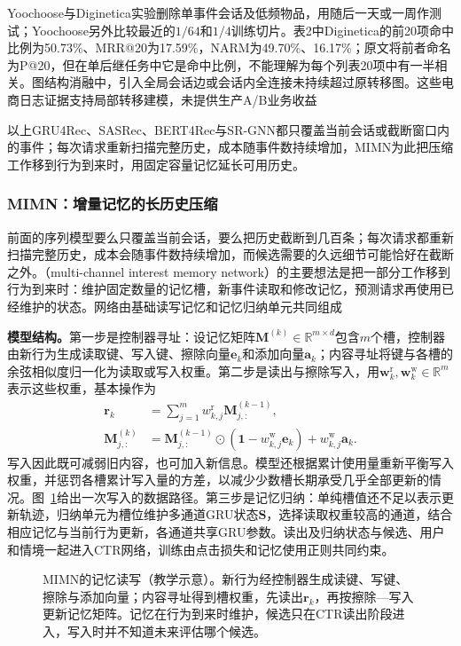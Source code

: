 Yoochoose与Diginetica实验删除单事件会话及低频物品，用随后一天或一周作测试；Yoochoose另外比较最近的$1/64$和$1/4$训练切片。表2中Diginetica的前20项命中比例为50.73\%、MRR@20为17.59\%，NARM为49.70\%、16.17\%；原文将前者命名为P@20，但在单后继任务中它是命中比例，不能理解为每个列表20项中有一半相关。图结构消融中，引入全局会话边或会话内全连接未持续超过原转移图。这些电商日志证据支持局部转移建模，未提供生产A/B业务收益

以上GRU4Rec、SASRec、BERT4Rec与SR-GNN都只覆盖当前会话或截断窗口内的事件；每次请求重新扫描完整历史，成本随事件数持续增加，MIMN为此把压缩工作移到行为到来时，用固定容量记忆延长可用历史。
\subsubsection{MIMN：增量记忆的长历史压缩}
\label{sec:rs-mimn}

前面的序列模型要么只覆盖当前会话，要么把历史截断到几百条；每次请求都重新扫描完整历史，成本会随事件数持续增加，而候选需要的久远细节可能恰好在截断之外。（multi-channel interest memory network）的主要想法是把一部分工作移到行为到来时：维护固定数量的记忆槽，新事件读取和修改记忆，预测请求再使用已经维护的状态。网络由基础读写记忆和记忆归纳单元共同组成

\textbf{模型结构。}第一步是控制器寻址：设记忆矩阵$\bm{M}^{(k)}\in\mathbb{R}^{m\times d}$包含$m$个槽，控制器由新行为生成读取键、写入键、擦除向量$\bm{e}_k$和添加向量$\bm{a}_k$；内容寻址将键与各槽的余弦相似度归一化为读取或写入权重。第二步是读出与擦除写入，用$\bm{w}^{\mathrm{r}}_k,\bm{w}^{\mathrm{w}}_k\in\mathbb{R}^m$表示这些权重，基本操作为
\begin{align}
  \bm{r}_k&=\sum_{j=1}^{m}w^{\mathrm{r}}_{k,j}\bm{M}^{(k-1)}_{j,:},\\
  \bm{M}^{(k)}_{j,:}
    &=\bm{M}^{(k-1)}_{j,:}\odot
        (\bm{1}-w^{\mathrm{w}}_{k,j}\bm{e}_k)
       +w^{\mathrm{w}}_{k,j}\bm{a}_k.
  \label{eq:rs-mimn-write}
\end{align}
写入因此既可减弱旧内容，也可加入新信息。模型还根据累计使用量重新平衡写入权重，并惩罚各槽累计写入量的方差，以减少少数槽长期承受几乎全部更新的情况。图~\ref{fig:rs-mimn-memory}给出一次写入的数据路径。第三步是记忆归纳：单纯槽值还不足以表示更新轨迹，归纳单元为槽位维护多通道GRU状态$\bm{S}$，选择读取权重较高的通道，结合相应记忆与当前行为更新，各通道共享GRU参数。读出及归纳状态与候选、用户和情境一起进入CTR网络，训练由点击损失和记忆使用正则共同约束。

\begin{figure}[htbp]
  \centering
  
  \caption{MIMN的记忆读写（教学示意）。新行为经控制器生成读键、写键、擦除与添加向量；内容寻址得到槽权重，先读出$\bm r_k$，再按擦除—写入更新记忆矩阵。记忆在行为到来时维护，候选只在CTR读出阶段进入，写入时并不知道未来评估哪个候选。}
  \label{fig:rs-mimn-memory}
\end{figure}

